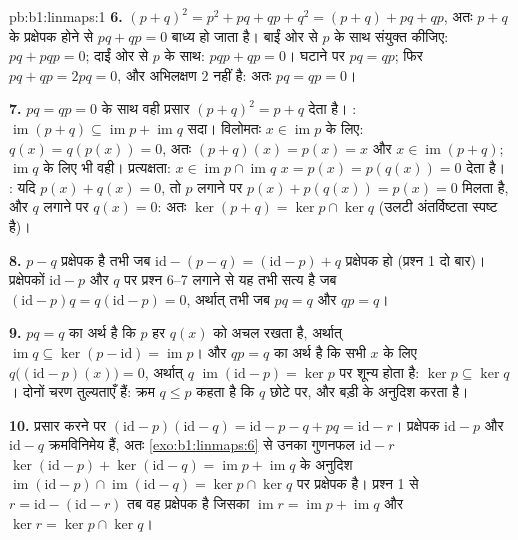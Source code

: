 \begin{solution}{pb:b1:linmaps:1}
\textbf{6.} $(p + q)^2 = p^2 + pq + qp + q^2 = (p + q) + pq + qp$, अतः $p +
q$ के प्रक्षेपक होने से $pq + qp = 0$ बाध्य हो जाता है। बाईं ओर से $p$ के
साथ संयुक्त कीजिए: $pq + pqp = 0$; दाईं ओर से $p$ के साथ: $pqp + qp = 0$।
घटाने पर $pq = qp$; फिर $pq + qp = 2pq = 0$, और अभिलक्षण $2$ नहीं है: अतः
$pq = qp = 0$।

\textbf{7.} $pq = qp = 0$ के साथ वही प्रसार $(p + q)^2 = p + q$ देता है।
: $\operatorname{im}(p + q) \subseteq \operatorname{im} p +
\operatorname{im} q$ सदा। विलोमतः $x \in \operatorname{im} p$ के लिए: $q(x)
= q(p(x)) = 0$, अतः $(p + q)(x) = p(x) = x$ और $x \in
\operatorname{im}(p+q)$; $\operatorname{im} q$ के लिए भी वही। प्रत्यक्षता:
$x \in \operatorname{im} p \cap \operatorname{im} q$ $x = p(x) = p(q(x)) =
0$ देता है। : यदि $p(x) + q(x) = 0$, तो $p$ लगाने पर $p(x) + p(q(x)) =
p(x) = 0$ मिलता है, और $q$ लगाने पर $q(x) = 0$: अतः $\ker(p + q) = \ker p
\cap \ker q$ (उलटी अंतर्विष्टता स्पष्ट है)।

\textbf{8.} $p - q$ प्रक्षेपक है तभी जब $\mathrm{id} - (p - q) =
(\mathrm{id} - p) + q$ प्रक्षेपक हो (प्रश्न 1 दो बार)। प्रक्षेपकों
$\mathrm{id} - p$ और $q$ पर प्रश्न 6--7 लगाने से यह तभी सत्य है जब
$(\mathrm{id} - p)q = q(\mathrm{id} - p) = 0$, अर्थात् तभी जब $pq = q$ और
$qp = q$।

\textbf{9.} $pq = q$ का अर्थ है कि $p$ हर $q(x)$ को अचल रखता है, अर्थात्
$\operatorname{im} q \subseteq \ker(p - \mathrm{id}) = \operatorname{im} p$।
और $qp = q$ का अर्थ है कि सभी $x$ के लिए $q\bigl((\mathrm{id} - p)(x)\bigr)
= 0$, अर्थात् $q$ $\operatorname{im}(\mathrm{id} - p) = \ker p$ पर शून्य
होता है: $\ker p \subseteq \ker q$। दोनों चरण तुल्यताएँ हैं: क्रम $q \leq p$
कहता है कि $q$ छोटे  पर, और बड़ी  के अनुदिश  करता है।

\textbf{10.} प्रसार करने पर $(\mathrm{id} - p)(\mathrm{id} - q) =
\mathrm{id} - p - q + pq = \mathrm{id} - r$। प्रक्षेपक $\mathrm{id} - p$ और
$\mathrm{id} - q$ क्रमविनिमेय हैं, अतः \cref{exo:b1:linmaps:6} से उनका
गुणनफल $\mathrm{id} - r$ $\ker(\mathrm{id} - p) + \ker(\mathrm{id} - q) =
\operatorname{im} p + \operatorname{im} q$ के अनुदिश
$\operatorname{im}(\mathrm{id} - p) \cap \operatorname{im}(\mathrm{id} - q)
= \ker p \cap \ker q$ पर प्रक्षेपक है। प्रश्न 1 से $r = \mathrm{id} -
(\mathrm{id} - r)$ तब वह प्रक्षेपक है जिसका $\operatorname{im} r =
\operatorname{im} p + \operatorname{im} q$ और $\ker r = \ker p \cap \ker q$।


\end{solution}
